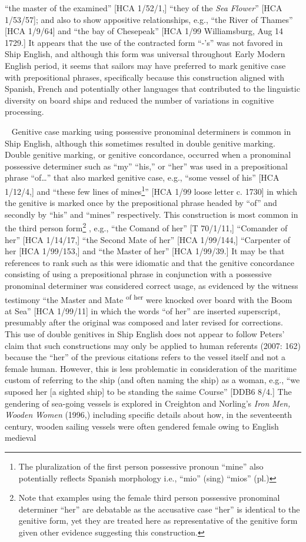 “the master of the examined” [HCA 1/52/1,] “they of the \textit{Sea} \textit{Flower}” [HCA 1/53/57]; and also to show appositive relationships, e.g., “the River of Thames” [HCA 1/9/64] and “the bay of Chesepeak” [HCA 1/99 Williamsburg, Aug 14 1729.] It appears that the use of the contracted form “-’s” was not favored in Ship English, and although this form was universal throughout Early Modern English period, it seems that sailors may have preferred to mark genitive case with prepositional phrases, specifically because this construction aligned with Spanish, French and potentially other languages that contributed to the linguistic diversity on board ships and reduced the number of variations in cognitive processing.

~  Genitive case marking using possessive pronominal determiners is common in Ship English, although this sometimes resulted in double genitive marking. Double genitive marking, or genitive concordance, occurred when a pronominal possessive determiner such as “my” “his,” or “her” was used in a prepositional phrase “of…” that also marked genitive case, e.g., “some vessel of his” [HCA 1/12/4,] and “these few lines of mines\footnote{The pluralization of the first person possessive pronoun “mine” also potentially reflects Spanish morphology i.e., “mio” (sing) “mios” (pl.)}” [HCA 1/99 loose letter c. 1730] in which the genitive is marked once by the prepositional phrase headed by “of” and secondly by “his” and “mines” respectively. This construction is most common in the third person form\footnote{Note that examples using the female third person possessive pronominal determiner “her” are debatable as the accusative case “her” is identical to the genitive form, yet they are treated here as representative of the genitive form given other evidence suggesting this construction.} , e.g., “the Comand of her” [T 70/1/11,] “Comander of her” [HCA 1/14/17,] “the Second Mate of her” [HCA 1/99/144,] “Carpenter of her [HCA 1/99/153,] and “the Master of her” [HCA 1/99/39.] It may be that references to rank such as this were idiomatic and that the genitive concordance consisting of using a prepositional phrase in conjunction with a possessive pronominal determiner was considered correct usage, as evidenced by the witness testimony “the Master and Mate \textsuperscript{of her} were knocked over board with the Boom at Sea” [HCA 1/99/11] in which the words “of her” are inserted superscript, presumably after the original was composed and later revised for corrections.  This use of double genitives in Ship English does not appear to follow Peters’ claim that such constructions may only be applied to human referents (2007: 162) because the “her” of the previous citations refers to the vessel itself and not a female human. However, this is less problematic in consideration of the maritime custom of referring to the ship (and often naming the ship) as a woman, e.g., “we suposed her [a sighted ship] to be standing the saime Course” [DDB6 8/4.] The gendering of sea-going vessels is explored in Creighton and Norling’s \textit{Iron} \textit{Men,} \textit{Wooden} \textit{Women} (1996,) including specific details about how, in the seventeenth century, wooden sailing vessels were often gendered female owing to English medieval 
